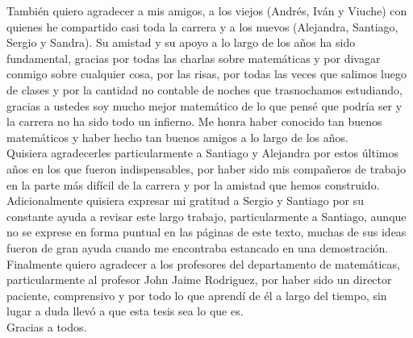También quiero agradecer a mis amigos, a los viejos (Andrés, Iván y Viuche) con quienes he compartido casi toda la carrera y a los nuevos (Alejandra, Santiago, Sergio y Sandra). Su amistad y su apoyo a lo largo de los años ha sido fundamental, gracias por todas las charlas sobre matemáticas y por divagar conmigo sobre cualquier cosa, por las risas, por todas las veces que salimos luego de clases y por la cantidad no contable de noches que trasnochamos estudiando, gracias a ustedes soy mucho mejor matemático de lo que pensé que podría ser y la carrera no ha sido todo un infierno. Me honra haber conocido tan buenos matemáticos y haber hecho tan buenos amigos a lo largo de los años.\\
Quisiera agradecerles particularmente a Santiago y Alejandra por estos últimos años en los que fueron indispensables, por haber sido mis compañeros de trabajo en la parte más difícil de la carrera y por la amistad que hemos construido.\\

Adicionalmente quisiera expresar mi gratitud a Sergio y Santiago por su constante ayuda a revisar este largo trabajo, particularmente a Santiago, aunque no se  exprese en forma puntual en las páginas de este texto, muchas de sus ideas fueron de gran ayuda cuando me encontraba estancado en una demostración.\\

Finalmente quiero agradecer a los profesores del departamento de matemáticas, particularmente al profesor John Jaime Rodriguez, por haber sido un director paciente, comprensivo y por todo lo que aprendí de él a largo del tiempo, sin lugar a duda llevó a que esta tesis sea lo que es.\\

Gracias a todos.
\thispagestyle{empty}
